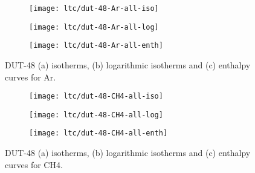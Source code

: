 \begin{figure}[htb]
    \centering
    \begin{subfigure}{0.33\linewidth}
        \texttt{[image: ltc/dut-48-Ar-all-iso]}%
        \caption{}
    \end{subfigure}%
    \begin{subfigure}{0.33\linewidth}
        \texttt{[image: ltc/dut-48-Ar-all-log]}%
        \caption{}
    \end{subfigure}%
    \begin{subfigure}{0.33\linewidth}
        \texttt{[image: ltc/dut-48-Ar-all-enth]}%
        \caption{}
    \end{subfigure}%
    \caption{DUT-48 (a) isotherms, (b) logarithmic isotherms and 
    (c) enthalpy curves for Ar.}%
    \label{appx:dut:fig:dut-48-Ar-ltc}
\end{figure}

\begin{figure}[htb]
    \centering
    \begin{subfigure}{0.33\linewidth}
        \texttt{[image: ltc/dut-48-CH4-all-iso]}%
        \caption{}
    \end{subfigure}%
    \begin{subfigure}{0.33\linewidth}
        \texttt{[image: ltc/dut-48-CH4-all-log]}%
        \caption{}
    \end{subfigure}%
    \begin{subfigure}{0.33\linewidth}
        \texttt{[image: ltc/dut-48-CH4-all-enth]}%
        \caption{}
    \end{subfigure}%
    \caption{DUT-48 (a) isotherms, (b) logarithmic isotherms and 
    (c) enthalpy curves for CH4.}%
    \label{appx:dut:fig:dut-48-CH4-ltc}
\end{figure}

\pagebreak